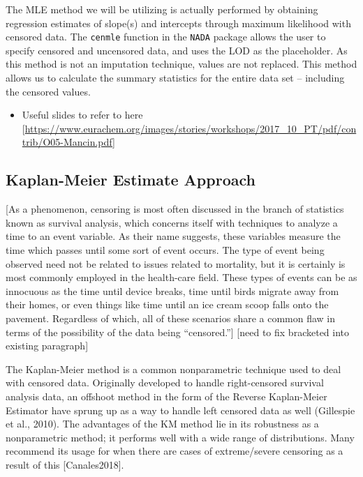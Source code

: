 \documentclass[12pt, twoside]{amherstthesis}
\providecommand{\tightlist}{%
  \setlength{\itemsep}{0pt}\setlength{\parskip}{0pt}}
\begin{document}
The MLE method we will be utilizing is actually performed by obtaining regression estimates of slope(s) and intercepts through maximum likelihood with censored data. The \texttt{cenmle} function in the \texttt{NADA} package allows the user to specify censored and uncensored data, and uses the LOD as the placeholder. As this method is not an imputation technique, values are not replaced. This method allows us to calculate the summary statistics for the entire data set -- including the censored values.
\begin{itemize}
\tightlist
\item
  Useful slides to refer to here {[}\url{https://www.eurachem.org/images/stories/workshops/2017_10_PT/pdf/contrib/O05-Mancin.pdf}{]}
\end{itemize}
\hypertarget{Kaplan-Meier}{%
\subsection{Kaplan-Meier Estimate Approach}\label{Kaplan-Meier}}

{[}As a phenomenon, censoring is most often discussed in the branch of statistics known as survival analysis, which concerns itself with techniques to analyze a time to an event variable. As their name suggests, these variables measure the time which passes until some sort of event occurs. The type of event being observed need not be related to issues related to mortality, but it is certainly is most commonly employed in the health-care field. These types of events can be as innocuous as the time until device breaks, time until birds migrate away from their homes, or even things like time until an ice cream scoop falls onto the pavement. Regardless of which, all of these scenarios share a common flaw in terms of the possibility of the data being ``censored.''{]} {[}need to fix bracketed into existing paragraph{]}

The Kaplan-Meier method is a common nonparametric technique used to deal with censored data. Originally developed to handle right-censored survival analysis data, an offshoot method in the form of the Reverse Kaplan-Meier Estimator have sprung up as a way to handle left censored data as well (Gillespie et al., 2010). The advantages of the KM method lie in its robustness as a nonparametric method; it performs well with a wide range of distributions. Many recommend its usage for when there are cases of extreme/severe censoring as a result of this {[}Canales2018{]}.
\end{document}
